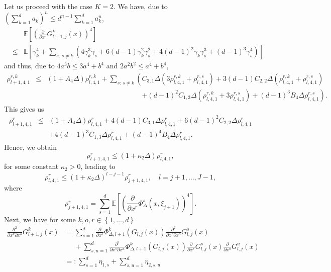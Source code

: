 \documentclass[11pt,a4paper]{amsart}
\theoremstyle{plain}
\theoremstyle{definition}
\theoremstyle{remark}
\numberwithin{equation}{section}
\newcommand*{\EE}{\mathbb E}
\renewcommand*{\doteq}{:=}
\begin{document}
Let us proceed with the case $K=2$. We have, due to $(\sum_{k=1}^da_k)^n\le d^{n-1}\sum_{k=1}^d a_k^n$,
\begin{eqnarray*}
&&\EE\left[\left(\frac{\partial}{\partial x^r}G_{l+1,j}^k(x)\right)^{4}\right]\\
&\leq&\EE\left[\gamma_k^4+\sum_{s:\,s\neq k}\left(4\gamma_k^3\gamma_s+6(d-1)\gamma_k^2\gamma_s^2+4(d-1)^2\gamma_k\gamma_s^3+(d-1)^3\gamma_s^4\right)\right]
\end{eqnarray*}
and thus, due to $4a^3b\le 3a^4+b^4$ and $2a^2b^2\le a^4+b^4$,
\begin{eqnarray*}
\rho_{l+1,4,1}^{r,k}
&\le & (1+A_4\Delta)\rho_{l,4,1}^{r,k}
+\sum_{s:\,s\neq k}\left(C_{3,1}\Delta(3\rho_{l,4,1}^{r,k}+\rho_{l,4,1}^{r,s})+3(d-1)C_{2,2}\Delta(\rho_{l,4,1}^{r,k}+\rho_{l,4,1}^{r,s})\right.\\
&&\phantom{(1+A_{4}\Delta)\rho_{l,4,1}^{r,k}
+\sum_{s:\,s\neq k}\left(\right.}\left.+(d-1)^2C_{1,3}\Delta(\rho_{l,4,1}^{r,k}+3\rho_{l,4,1}^{r,s})+ (d-1)^3B_{4}\Delta\rho_{l,4,1}^{r,s}\right).
\end{eqnarray*}
This gives us
\begin{eqnarray*}
\rho_{l+1,4,1}^{r}
&\le & (1+A_{4}\Delta)\rho_{l,4,1}^{r}
+4(d-1)C_{3,1}\Delta\rho_{l,4,1}^{r}+6(d-1)^2C_{2,2}\Delta\rho_{l,4,1}^{r}\\
&&+4(d-1)^3C_{1,3}\Delta\rho_{l,4,1}^{r}+ (d-1)^4B_{4}\Delta\rho_{l,4,1}^{r}.
\end{eqnarray*}
Hence, we obtain
\[
\rho_{l+1,4,1}^{r}\leq (1+\kappa_{2}\Delta)\rho_{l,4,1}^{r},
\]
for some constant $\kappa_{2}>0$, leading to 
\[
\rho_{l,4,1}^{r}\leq(1+\kappa_{2}\Delta)^{l-j-1}\rho_{j+1,4,1}^{r}
,\quad l=j+1,\ldots,J-1,
\]
where 
\[
\rho_{j+1,4,1}^{r}=\sum_{s=1}^d\EE\left[\left(\frac{\partial}{\partial x^r}\Phi_{\Delta}^s\left(x,\xi_{j+1}\right)\right)^{4}\right].
\]
Next, we have for some $k,o,r\in\left\{1,\ldots,d\right\}$
\begin{align*}
\frac{\partial^2}{\partial x^r\partial x^o}G_{l+1,j}^k(x)&=\sum_{s=1}^d\frac{\partial}{\partial x^s}\Phi_{\Delta,l+1}^k(G_{l,j}(x))\frac{\partial^2}{\partial x^r\partial x^o}G_{l,j}^s(x)\\
&\phantom{=}+\sum_{s,u=1}^d\frac{\partial^2}{\partial x^s\partial x^u}\Phi_{\Delta,l+1}^k(G_{l,j}(x))\frac{\partial}{\partial x^r}G_{l,j}^s(x)\frac{\partial}{\partial x^o}G_{l,j}^u(x)\\
&=:\sum_{s=1}^d\eta_{1,s}+\sum_{s,u=1}^d\eta_{2,s,u}
\end{align*}
\end{document}
